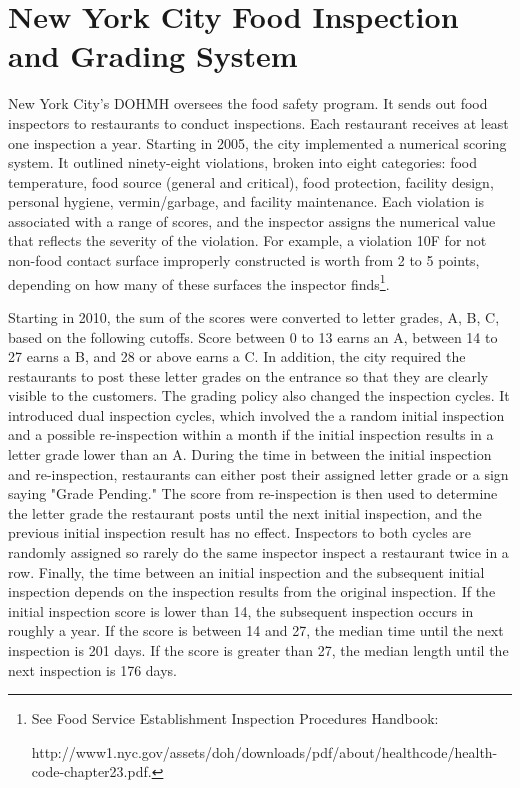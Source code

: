 \documentclass[11pt]{article}
\begin{document}
\section{New York City Food Inspection and Grading System}
\label{background}

New York City's DOHMH oversees the food safety program. It sends out food inspectors to restaurants to conduct inspections. Each restaurant receives at least one inspection a year. Starting in 2005, the city implemented a numerical scoring system. It outlined ninety-eight violations, broken into eight categories: food temperature, food source (general and critical), food protection, facility design, personal hygiene, vermin/garbage, and facility maintenance. Each violation is associated with a range of scores, and the inspector assigns the numerical value that reflects the severity of the violation. For example, a violation 10F for not non-food contact surface improperly constructed is worth from 2 to 5 points, depending on how many of these surfaces the inspector finds\footnote{See Food Service Establishment Inspection Procedures Handbook: 

http://www1.nyc.gov/assets/doh/downloads/pdf/about/healthcode/health-code-chapter23.pdf. }.  

Starting in 2010, the sum of the scores were converted to letter grades, A, B, C, based on the following cutoffs. Score between 0 to 13 earns an A, between 14 to 27 earns a B, and 28 or above earns a C. In addition, the city required the restaurants to post these letter grades on the entrance so that they are clearly visible to the customers. The grading policy also changed the inspection cycles. It introduced dual inspection cycles, which involved the a random initial inspection and a possible re-inspection within a month if the initial inspection results in a letter grade lower than an A. During the time in between the initial inspection and re-inspection, restaurants can either post their assigned letter grade or a sign saying "Grade Pending." The score from re-inspection is then used to determine the letter grade the restaurant posts until the next initial inspection, and the previous initial inspection result has no effect. Inspectors to both cycles are randomly assigned so rarely do the same inspector inspect a restaurant twice in a row. Finally, the time between an initial inspection and the subsequent initial inspection depends on the inspection results from the original inspection. If the initial inspection score is lower than 14, the subsequent inspection occurs in roughly a year. If the score is between 14 and 27, the median time until the next inspection is 201 days. If the score is greater than 27, the median length until the next inspection is 176 days. 
\end{document}
